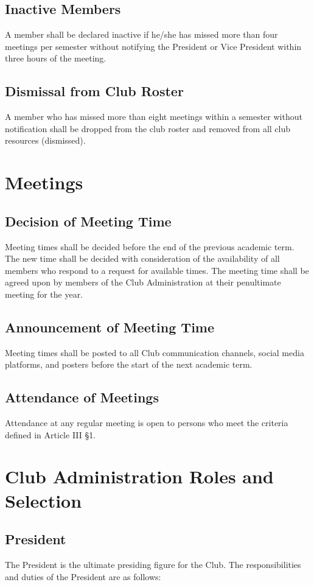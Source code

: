 \documentclass[english,11pt]{article}
\begin{document}
\subsection{Inactive Members}
A member shall be declared inactive if he/she has missed more than four meetings per semester without notifying the President or Vice President within three hours of the meeting.

\subsection{Dismissal from Club Roster}
A member who has missed more than eight meetings within a semester without notification shall be dropped from the club roster and removed from all club resources (dismissed).

\section{Meetings}
\subsection{Decision of Meeting Time}
Meeting times shall be decided before the end of the previous academic term.
The new time shall be decided with consideration of the availability of all members who respond to a request for available times.
The meeting time shall be agreed upon by members of the Club Administration at their penultimate meeting for the year.

\subsection{Announcement of Meeting Time}
Meeting times shall be posted to all Club communication channels, social media platforms, and posters before the start of the next academic term.

\subsection{Attendance of Meetings}
Attendance at any regular meeting is open to persons who meet the criteria defined in Article III §1.

\section{Club Administration Roles and Selection}
\subsection{President}
The President is the ultimate presiding figure for the Club.
The responsibilities and duties of the President are as follows:
\end{document}
